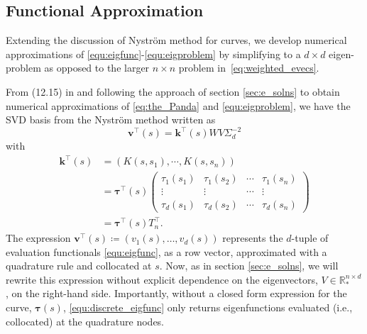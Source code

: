 \documentclass[pdflatex,iicol]{sn-jnl}%
\theoremstyle{thmstyleone}%
\theoremstyle{thmstyletwo}%
\theoremstyle{thmstylethree}%
\begin{document}
\subsection{Functional Approximation}\label{subsec:func_approx}
Extending the discussion of Nystr\"om method for curves, we develop numerical approximations of \eqref{equ:eigfunc}-\eqref{equ:eigproblem} by simplifying to a $d\times d$ eigen-problem as opposed to the larger $n\times n$ problem in~\eqref{eq:weighted_evecs}. 

From (12.15) in \cite{fasshauer2015kernel} and following the approach of section \ref{sec:e_solns} to obtain numerical approximations of \eqref{eq:the_Panda} and \eqref{equ:eigproblem}, we have the SVD basis from the Nystr\"om method written as
\begin{equation}\label{equ:discrete_eigfunc}
\boldsymbol{v}^{\top}(s) = \mathbf{k}^{\top}(s) W V\Sigma^{-2}_d
\end{equation}
with 
\begin{align*}
    \mathbf{k}^{\top}(s) & = (K( s,  s_1), \cdots, K( s, s_n)) \\
                      & =  \boldsymbol{\tau}^{\top}(s) \left(\begin{matrix} \tau_1(s_1) & \tau_1(s_2) & \cdots&  \tau_1(s_n) \\ 
                     \vdots & \vdots & \cdots & \vdots\\
                     \tau_d(s_1) & \tau_d(s_2) & \cdots &  \tau_d(s_n) \end{matrix}\right)\\
                     & = \boldsymbol{\tau}^{\top}(s)T_n^{\top}.
\end{align*}
The expression $\boldsymbol{v}^{\top}(s) \coloneqq (v_1(s),\dots,v_d(s))$ represents the $d$-tuple of evaluation functionals \eqref{equ:eigfunc}, as a row vector, approximated with a quadrature rule and collocated at $s$. Now, as in section \ref{sec:e_solns}, we will rewrite this expression without explicit dependence on the eigenvectors, $V \in \mathbb{R}_*^{n\times d}$, on the right-hand side. Importantly, without a closed form expression for the curve, $\boldsymbol{\tau}(s)$, \eqref{equ:discrete_eigfunc} only returns eigenfunctions evaluated (i.e., collocated) at the quadrature nodes.
\end{document}
